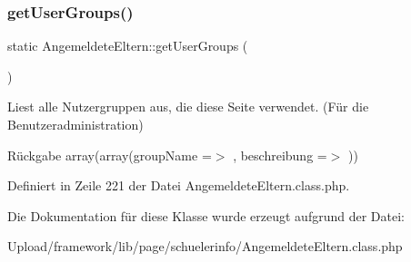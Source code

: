 \mbox{\label{class_angemeldete_eltern_a1d7d4c5050358db70a5bf45906f33fc8}} 
\subsubsection{\texorpdfstring{get\+User\+Groups()}{getUserGroups()}}
{\footnotesize\ttfamily static Angemeldete\+Eltern\+::get\+User\+Groups (\begin{DoxyParamCaption}{ }\end{DoxyParamCaption})\hspace{0.3cm}{\ttfamily [static]}}

Liest alle Nutzergruppen aus, die diese Seite verwendet. (Für die Benutzeradministration) \begin{DoxyReturn}{Rückgabe}
array(array(\textquotesingle{}group\+Name\textquotesingle{} =$>$ \textquotesingle{}\textquotesingle{}, \textquotesingle{}beschreibung\textquotesingle{} =$>$ \textquotesingle{}\textquotesingle{})) 
\end{DoxyReturn}


Definiert in Zeile 221 der Datei Angemeldete\+Eltern.\+class.\+php.



Die Dokumentation für diese Klasse wurde erzeugt aufgrund der Datei\+:\begin{DoxyCompactItemize}
\item 
Upload/framework/lib/page/schuelerinfo/Angemeldete\+Eltern.\+class.\+php\end{DoxyCompactItemize}
